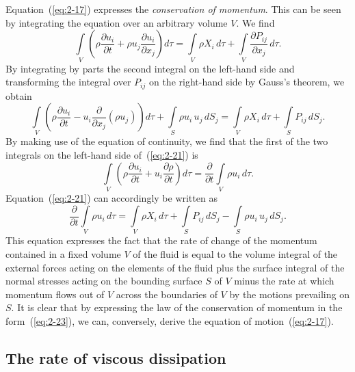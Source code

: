 Equation~(\ref{eq:2-17}) expresses the \emph{conservation of momentum}. This can be
seen by integrating the equation over an arbitrary volume $V$. We find
\begin{equation}
\label{eq:2-20}
\int\limits_V\!\left(\rho\frac{\partial u_i}{\partial t} + \rho u_j\frac{\partial u_i}{\partial x_j}\right)d\tau = \int\limits_V \rho X_i\,d\tau + \int\limits_V \frac{\partial P_{ij}}{\partial x_j}\,d\tau.
\end{equation}
By integrating by parts the second integral on the left-hand side and
transforming the integral over $P_{ij}$ on the right-hand side by Gauss's
theorem, we obtain
\begin{equation}
\label{eq:2-21}
\int\limits_V\!\left(\rho\frac{\partial u_i}{\partial t} - u_i\frac{\partial}{\partial x_j}(\rho u_j)\right)d\tau + \int\limits_S \rho u_i\,u_j\,dS_j = \int\limits_V \rho X_i\,d\tau + \int\limits_S P_{ij}\,dS_j.
\end{equation}
By making use of the equation of continuity, we find that the first of the
two integrals on the left-hand side of~(\ref{eq:2-21}) is
\begin{equation}
\label{eq:2-22}
\int\limits_V\!\left(\rho\frac{\partial u_i}{\partial t} + u_i\frac{\partial\rho}{\partial t}\right)d\tau = \frac{\partial}{\partial t}\int\limits_V \rho u_i\,d\tau.
\end{equation}
Equation~(\ref{eq:2-21}) can accordingly be written as
\begin{equation}
\label{eq:2-23}
\frac{\partial}{\partial t}\int\limits_V \rho u_i\,d\tau = \int\limits_V \rho X_i\,d\tau + \int\limits_S P_{ij}\,dS_j - \int\limits_S \rho u_i\,u_j\,dS_j.
\end{equation}
This equation expresses the fact that the rate of change of the momentum
contained in a fixed volume $V$ of the fluid is equal to the volume integral
of the external forces acting on the elements of the fluid plus the surface integral of the normal stresses acting on the bounding surface $S$ of $V$
minus the rate at which momentum flows out of $V$ across the boundaries
of $V$ by the motions prevailing on $S$. It is clear that by expressing the
law of the conservation of momentum in the form~(\ref{eq:2-23}), we can, conversely, derive the equation of motion~(\ref{eq:2-17}).

\subsection{The rate of viscous dissipation}\label{sec:7c}

